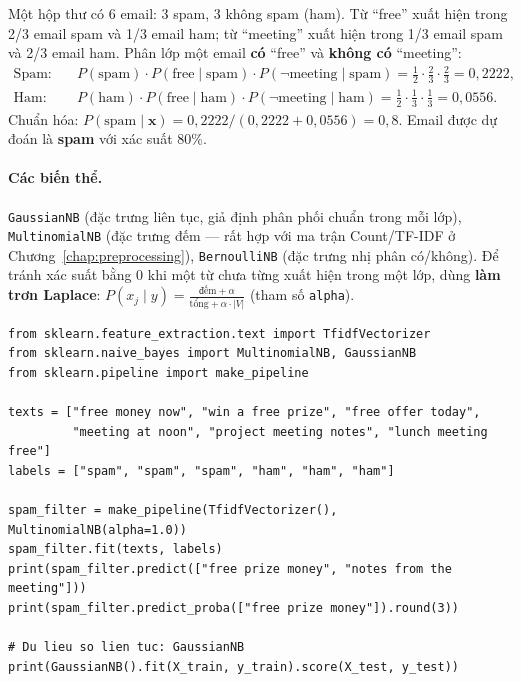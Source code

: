 \begin{example}
Một hộp thư có 6 email: 3 spam, 3 không spam (ham). Từ ``free'' xuất hiện trong 2/3 email spam và 1/3 email ham; từ ``meeting'' xuất hiện trong 1/3 email spam và 2/3 email ham. Phân lớp một email \textbf{có} ``free'' và \textbf{không có} ``meeting'':
\begin{align*}
    \text{Spam}: \quad & P(\text{spam}) \cdot P(\text{free} \mid \text{spam}) \cdot P(\neg\text{meeting} \mid \text{spam}) = \tfrac{1}{2} \cdot \tfrac{2}{3} \cdot \tfrac{2}{3} = 0{,}2222, \\
    \text{Ham}: \quad & P(\text{ham}) \cdot P(\text{free} \mid \text{ham}) \cdot P(\neg\text{meeting} \mid \text{ham}) = \tfrac{1}{2} \cdot \tfrac{1}{3} \cdot \tfrac{1}{3} = 0{,}0556.
\end{align*}
Chuẩn hóa: $P(\text{spam} \mid \mathbf{x}) = 0{,}2222 / (0{,}2222 + 0{,}0556) = 0{,}8$. Email được dự đoán là \textbf{spam} với xác suất 80\%.
\end{example}

\paragraph{Các biến thể.} \texttt{GaussianNB} (đặc trưng liên tục, giả định phân phối chuẩn trong mỗi lớp), \texttt{MultinomialNB} (đặc trưng đếm --- rất hợp với ma trận Count/TF-IDF ở Chương~\ref{chap:preprocessing}), \texttt{BernoulliNB} (đặc trưng nhị phân có/không). Để tránh xác suất bằng 0 khi một từ chưa từng xuất hiện trong một lớp, dùng \textbf{làm trơn Laplace}: $P(x_j \mid y) = \frac{\text{đếm} + \alpha}{\text{tổng} + \alpha \cdot |V|}$ (tham số \texttt{alpha}).

\begin{lstlisting}[caption={Naive Bayes cho phân loại văn bản kết hợp TF-IDF}]
from sklearn.feature_extraction.text import TfidfVectorizer
from sklearn.naive_bayes import MultinomialNB, GaussianNB
from sklearn.pipeline import make_pipeline

texts = ["free money now", "win a free prize", "free offer today",
         "meeting at noon", "project meeting notes", "lunch meeting free"]
labels = ["spam", "spam", "spam", "ham", "ham", "ham"]

spam_filter = make_pipeline(TfidfVectorizer(), MultinomialNB(alpha=1.0))
spam_filter.fit(texts, labels)
print(spam_filter.predict(["free prize money", "notes from the meeting"]))
print(spam_filter.predict_proba(["free prize money"]).round(3))

# Du lieu so lien tuc: GaussianNB
print(GaussianNB().fit(X_train, y_train).score(X_test, y_test))
\end{lstlisting}

